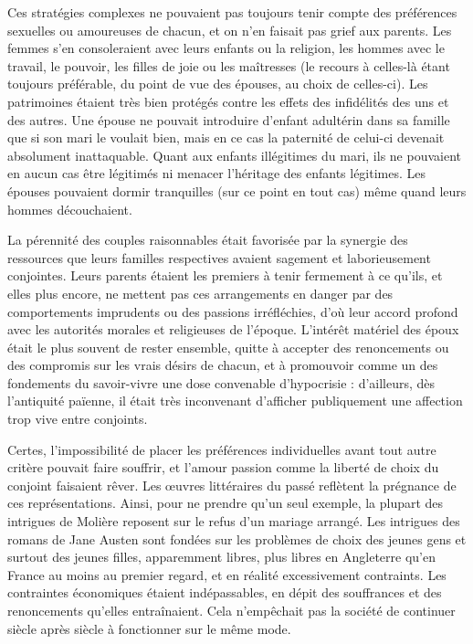  Ces stratégies complexes ne pouvaient pas toujours tenir compte des préférences sexuelles ou amoureuses de chacun, et on n'en faisait pas grief aux parents. Les femmes s'en consoleraient avec leurs enfants ou la religion, les hommes avec le travail, le pouvoir, les filles de joie ou les maîtresses (le recours à celles-là étant toujours préférable, du point de vue des épouses, au choix de celles-ci). Les patrimoines étaient très bien protégés contre les effets des infidélités des uns et des autres. Une épouse ne pouvait introduire d'enfant adultérin dans sa famille que si son mari le voulait bien, mais en ce cas la paternité de celui-ci devenait absolument inattaquable. Quant aux enfants illégitimes du mari, ils ne pouvaient en aucun cas être légitimés ni menacer l'héritage des enfants légitimes. Les épouses pouvaient dormir tranquilles (sur ce point en tout cas) même quand leurs hommes découchaient. 

 La pérennité des couples raisonnables était favorisée par la synergie des ressources que leurs familles respectives avaient sagement et laborieusement conjointes. Leurs parents étaient les premiers à tenir fermement à ce qu'ils, et elles plus encore, ne mettent pas ces arrangements en danger par des comportements imprudents ou des passions irréfléchies, d'où leur accord profond avec les autorités morales et religieuses de l'époque. L'intérêt matériel des époux était le plus souvent de rester ensemble, quitte à accepter des renoncements ou des compromis sur les vrais désirs de chacun, et à promouvoir comme un des fondements du savoir-vivre une dose convenable d'hypocrisie : d'ailleurs, dès l'antiquité païenne, il était très inconvenant d'afficher publiquement une affection trop vive entre conjoints. 

 Certes, l'impossibilité de placer les préférences individuelles avant tout autre critère pouvait faire souffrir, et l'amour passion comme la liberté de choix du conjoint faisaient rêver. Les œuvres littéraires du passé reflètent la prégnance de ces représentations. Ainsi, pour ne prendre qu'un seul exemple, la plupart des intrigues de Molière reposent sur le refus d'un mariage arrangé. Les intrigues des romans de Jane Austen sont fondées sur les problèmes de choix des jeunes gens et surtout des jeunes filles, apparemment libres, plus libres en Angleterre qu'en France au moins au premier regard, et en réalité excessivement contraints. Les contraintes économiques étaient indépassables, en dépit des souffrances et des renoncements qu'elles entraînaient. Cela n'empêchait pas la société de continuer siècle après siècle à fonctionner sur le même mode. 

